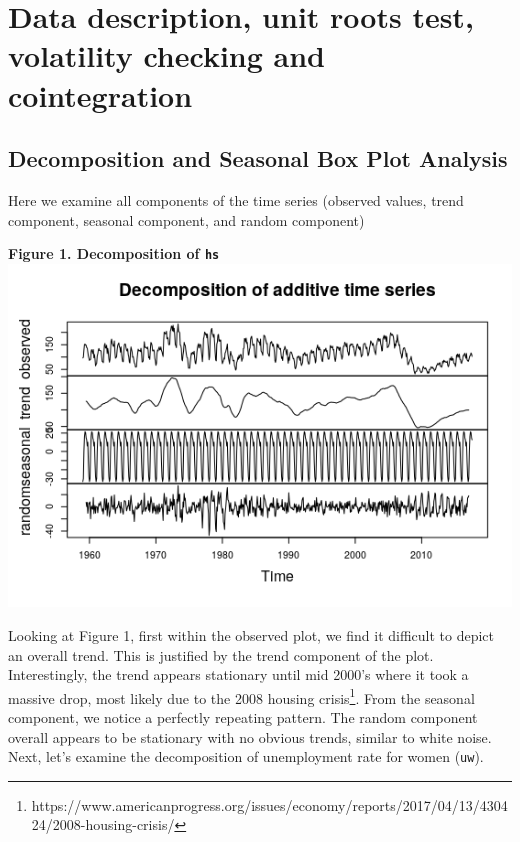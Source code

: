 \documentclass[11pt]{article}
\begin{document}
\section{Data description, unit roots test, volatility checking and cointegration}
\subsection{Decomposition and Seasonal Box Plot Analysis}
Here we examine all components of the time series (observed values, trend component, seasonal component, and random component)
\begin{center}
\textbf{Figure 1. Decomposition of \tt{hs}}
\includegraphics[scale=1]{decom-hs}
\end{center}
Looking at Figure 1, first within the observed plot, we find it difficult to depict an overall trend. This is justified by the trend component of the plot. Interestingly, the trend appears stationary until mid 2000's where it took a massive drop, most likely due to the 2008 housing crisis\footnote{https://www.americanprogress.org/issues/economy/reports/2017/04/13/430424/2008-housing-crisis/}. From the seasonal component, we notice a perfectly repeating pattern. The random component overall appears to be stationary with no obvious trends, similar to white noise. Next, let's examine the decomposition of unemployment rate for women ({\tt uw}).
\end{document}
